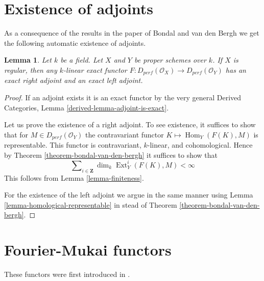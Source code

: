 \documentclass{stacks-project}
\theoremstyle{plain}
\newtheorem{lemma}[subsection]{Lemma}
\theoremstyle{definition}
\theoremstyle{remark}
\numberwithin{equation}{subsection}
\def\Hom{\mathop{\mathrm{Hom}}\nolimits}
\def\Ext{\mathop{\mathrm{Ext}}\nolimits}
\begin{document}
\section{Existence of adjoints}
\label{section-adjoints}

\noindent
As a consequence of the results in the paper of Bondal and van den Bergh
we get the following automatic existence of adjoints.

\begin{lemma}
\label{lemma-always-right-adjoints}
Let $k$ be a field. Let $X$ and $Y$ be proper schemes over $k$.
If $X$ is regular, then any $k$-linear exact functor
$F : D_{perf}(\mathcal{O}_X) \to D_{perf}(\mathcal{O}_Y)$
has an exact right adjoint and an exact left adjoint.
\end{lemma}

\begin{proof}
If an adjoint exists it is an exact functor by the very general
Derived Categories, Lemma \ref{derived-lemma-adjoint-is-exact}.

\medskip\noindent
Let us prove the existence of a right adjoint.
To see existence, it suffices to show that for
$M \in D_{perf}(\mathcal{O}_Y)$ the contravariant functor
$K \mapsto \Hom_Y(F(K), M)$ is representable.
This functor is contravariant, $k$-linear, and cohomological.
Hence by Theorem \ref{theorem-bondal-van-den-bergh}
it suffices to show that
$$
\sum\nolimits_{i \in \mathbf{Z}} \dim_k \Ext^i_Y(F(K), M) < \infty
$$
This follows from Lemma \ref{lemma-finiteness}.

\medskip\noindent
For the existence of the left adjoint we argue in the same
manner using Lemma \ref{lemma-homological-representable}
in stead of Theorem \ref{theorem-bondal-van-den-bergh}.
\end{proof}






\section{Fourier-Mukai functors}
\label{section-fourier-mukai}

\noindent
These functors were first introduced in \cite{Mukai}.
\end{document}
